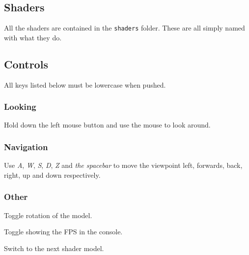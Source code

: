   \newpage

  \subsection{Shaders}
    
    All the shaders are contained in the \texttt{shaders} folder.  These are all
    simply named with what they do.

  \subsection{Controls}
    
    All keys listed below must be lowercase when pushed.
    
    \subsubsection{Looking}
      
      Hold down the left mouse button and use the mouse to look around.

    \subsubsection{Navigation}

      Use \emph{A}, \emph{W}, \emph{S}, \emph{D}, \emph{Z} and \emph{the
      spacebar} to move the viewpoint left, forwards, back, right, up and down
      respectively.

    \subsubsection{Other}
      \begin{description}
        \setlength{\topsep}{0pt}
        \setlength{\parskip}{0pt}
        \setlength{\partopsep}{0pt}
        \setlength{\parsep}{0pt}
        \setlength{\itemsep}{0pt}

        \item[Q]{ Toggle rotation of the model. }

        \item[E]{ Toggle showing the FPS in the console. }

        \item[R]{ Switch to the next shader model. }

      \end{description}

